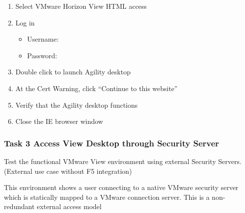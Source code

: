 \documentclass[letterpaper,10pt,english]{sphinxmanual}
\begin{document}
\begin{enumerate}
\item {} 
Select VMware Horizon View HTML access

\item {} 
Log in
\begin{itemize}
\item {} 
Username: 

\item {} 
Password: 

\end{itemize}

\item {} 
Double click to launch Agility desktop

\item {} 
At the Cert Warning, click “Continue to this website”

\item {} 
Verify that the Agility desktop functions

\item {} 
Close the IE browser window

\end{enumerate}


\subsubsection{Task 3 \textendash{} Access View Desktop through Security Server}
\label{\detokenize{class2/module1/lab1:task-3-access-view-desktop-through-security-server}}
Test the functional VMware View environment using external Security
Servers. (External use case without F5 integration)

This environment shows a user connecting to a native VMware security
server which is statically mapped to a VMware connection server. This is
a non-redundant external access model

\end{document}
